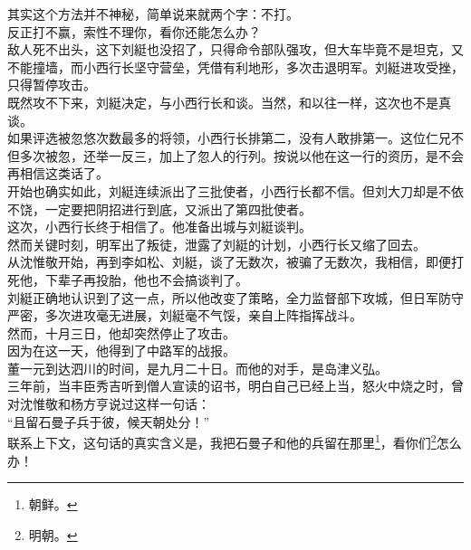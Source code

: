 \begin{multicols}{\theparacolNo}
其实这个方法并不神秘，简单说来就两个字：不打。\\

反正打不赢，索性不理你，看你还能怎么办？\\

敌人死不出头，这下刘綎也没招了，只得命令部队强攻，但大车毕竟不是坦克，又不能撞墙，而小西行长坚守营垒，凭借有利地形，多次击退明军。刘綎进攻受挫，只得暂停攻击。\\

既然攻不下来，刘綎决定，与小西行长和谈。当然，和以往一样，这次也不是真谈。\\

如果评选被忽悠次数最多的将领，小西行长排第二，没有人敢排第一。这位仁兄不但多次被忽，还举一反三，加上了忽人的行列。按说以他在这一行的资历，是不会再相信这类话了。\\

开始也确实如此，刘綎连续派出了三批使者，小西行长都不信。但刘大刀却是不依不饶，一定要把阴招进行到底，又派出了第四批使者。\\

这次，小西行长终于相信了。他准备出城与刘綎谈判。\\

然而关键时刻，明军出了叛徒，泄露了刘綎的计划，小西行长又缩了回去。\\

从沈惟敬开始，再到李如松、刘綎，谈了无数次，被骗了无数次，我相信，即便打死他，下辈子再投胎，他也不会搞谈判了。\\

刘綎正确地认识到了这一点，所以他改变了策略，全力监督部下攻城，但日军防守严密，多次进攻毫无进展，刘綎毫不气馁，亲自上阵指挥战斗。\\

然而，十月三日，他却突然停止了攻击。\\

因为在这一天，他得到了中路军的战报。\\

董一元到达泗川的时间，是九月二十日。而他的对手，是岛津义弘。\\

三年前，当丰臣秀吉听到僧人宣读的诏书，明白自己已经上当，怒火中烧之时，曾对沈惟敬和杨方亨说过这样一句话：\\

“且留石曼子兵于彼，候天朝处分！”\\

联系上下文，这句话的真实含义是，我把石曼子和他的兵留在那里\footnote{朝鲜。}，看你们\footnote{明朝。}怎么办！\\


\end{multicols}
